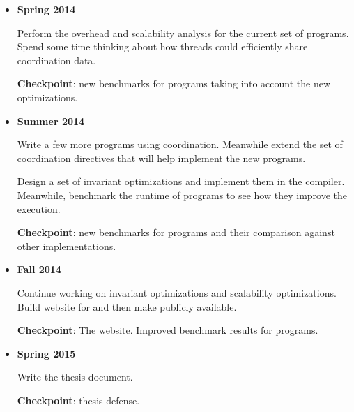 \begin{itemize}
   \item \textbf{Spring 2014}
      
   Perform the overhead and scalability analysis for the current set of \lang programs.
   Spend some time thinking about how threads could efficiently share coordination data.

   \textbf{Checkpoint}: new benchmarks for \lang programs taking into account the new optimizations.

   \item \textbf{Summer 2014}

   Write a few more programs using coordination.   
   Meanwhile extend the set of coordination directives that will help implement the new programs.
   
   Design a set of invariant optimizations and implement them in the compiler. Meanwhile, benchmark the runtime of programs to see how they improve the execution.

   \textbf{Checkpoint}: new benchmarks for \lang programs and their comparison against other implementations.
   
   \item \textbf{Fall 2014}
   
   Continue working on invariant optimizations and scalability optimizations.
   Build website for \lang and then make \lang publicly available.
   
   \textbf{Checkpoint}: The \lang website. Improved benchmark results for \lang programs.
   
   \item \textbf{Spring 2015}
   
   Write the thesis document.
   
   \textbf{Checkpoint}: thesis defense.

\end{itemize}

